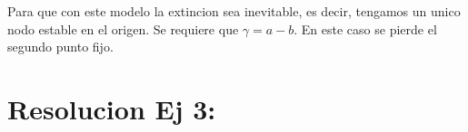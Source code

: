 \documentclass[twocolumn,aps,prl]{revtex4-1}
\begin{document}
Para que con este modelo la extincion sea inevitable, es decir, tengamos un unico nodo estable en el origen. Se requiere que $\gamma = a-b$. En este caso se pierde el segundo punto fijo.



% 
%                                 
% 

\section{Resolucion Ej 3:}
\end{document}
